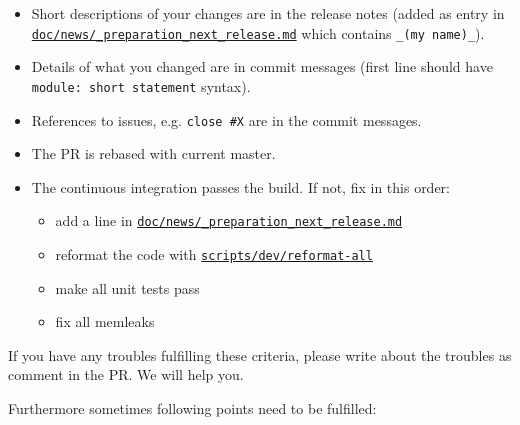 \documentclass[11pt,a4paper]{article}
\begin{document}
\begin{itemize}
\item Short descriptions of your changes are in the release notes
      (added as entry in \href{https://master.libelektra.org/doc/news/_preparation_next_release.md}{\texttt{doc/news/\_preparation\_next\_release.md}} which
      contains \verb+_(my name)_+).
\item Details of what you changed are in commit messages
      (first line should have \verb+module: short statement+ syntax).
\item References to issues, e.g. \verb+close #X+ are in the commit messages.
\item The PR is rebased with current master.
\item The continuous integration passes the build. If not, fix in this order:
\begin{itemize}
  \item add a line in \href{https://master.libelektra.org/doc/news/_preparation_next_release.md}{\texttt{doc/news/\_preparation\_next\_release.md}}
  \item reformat the code with \href{https://master.libelektra.org/scripts/dev/reformat-all}{\texttt{scripts/dev/reformat-all}}
  \item make all unit tests pass
  \item fix all memleaks
\end{itemize}
\end{itemize}

If you have any troubles fulfilling these criteria, please write
about the troubles as comment in the PR. We will help you.

Furthermore sometimes following points need to be fulfilled:
\end{document}
